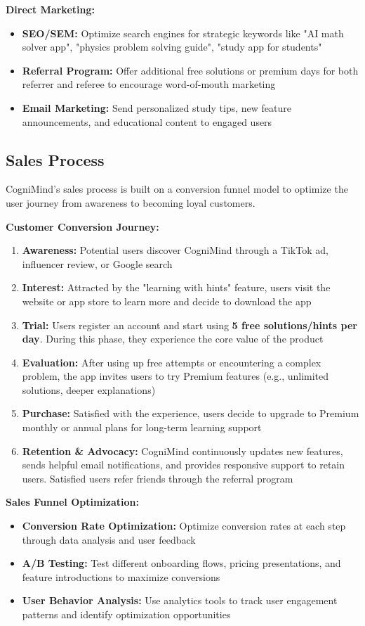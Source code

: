 \textbf{Direct Marketing:}
\begin{itemize}
    \item \textbf{SEO/SEM:} Optimize search engines for strategic keywords like "AI math solver app", "physics problem solving guide", "study app for students"
    \item \textbf{Referral Program:} Offer additional free solutions or premium days for both referrer and referee to encourage word-of-mouth marketing
    \item \textbf{Email Marketing:} Send personalized study tips, new feature announcements, and educational content to engaged users
\end{itemize}

\subsection{Sales Process}
CogniMind's sales process is built on a conversion funnel model to optimize the user journey from awareness to becoming loyal customers.

\textbf{Customer Conversion Journey:}
\begin{enumerate}
    \item \textbf{Awareness:} Potential users discover CogniMind through a TikTok ad, influencer review, or Google search
    \item \textbf{Interest:} Attracted by the "learning with hints" feature, users visit the website or app store to learn more and decide to download the app
    \item \textbf{Trial:} Users register an account and start using \textbf{5 free solutions/hints per day}. During this phase, they experience the core value of the product
    \item \textbf{Evaluation:} After using up free attempts or encountering a complex problem, the app invites users to try Premium features (e.g., unlimited solutions, deeper explanations)
    \item \textbf{Purchase:} Satisfied with the experience, users decide to upgrade to Premium monthly or annual plans for long-term learning support
    \item \textbf{Retention \& Advocacy:} CogniMind continuously updates new features, sends helpful email notifications, and provides responsive support to retain users. Satisfied users refer friends through the referral program
\end{enumerate}

\textbf{Sales Funnel Optimization:}
\begin{itemize}
    \item \textbf{Conversion Rate Optimization:} Optimize conversion rates at each step through data analysis and user feedback
    \item \textbf{A/B Testing:} Test different onboarding flows, pricing presentations, and feature introductions to maximize conversions
    \item \textbf{User Behavior Analysis:} Use analytics tools to track user engagement patterns and identify optimization opportunities
\end{itemize}

